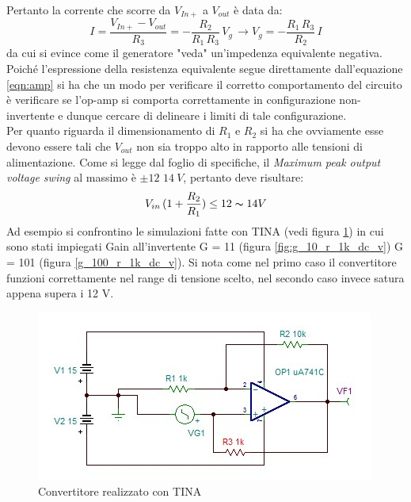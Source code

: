 \documentclass[journal, a4paper]{IEEEtran}
\begin{document}
Pertanto la corrente che scorre da $V_{In+}$ a $V_{out}$ è data da:
\begin{equation}
I = \frac{V_{In+} - V_{out}}{R_3} = -\frac{R_2}{R_1 \, R_3}\, V_g \, \rightarrow V_g = -\frac{R_1\,R_3}{R_2}\,I
\end{equation}
da cui si evince come il generatore "veda" un'impedenza equivalente negativa.\\
Poiché l'espressione della resistenza equivalente segue direttamente dall'equazione \ref{eqn:amp} si ha che un modo per verificare il corretto comportamento del circuito è verificare se l'op-amp si comporta correttamente in configurazione non-invertente e dunque cercare di delineare i limiti di tale configurazione.\\
Per quanto riguarda il dimensionamento di $R_1$ e $R_2$ si ha che ovviamente esse devono essere tali che $V_{out}$ non sia troppo alto in rapporto alle tensioni di alimentazione. Come si legge dal foglio di specifiche, il \textit{Maximum peak output voltage swing} al massimo è $\pm 12$ \textdiv $14~V$, pertanto deve risultare:
\begin{equation}
V_{in}\,(1+\frac{R_2}{R_1}) \leq 12 \thicksim 14 V
\end{equation}
Ad esempio si confrontino le simulazioni fatte con TINA (vedi figura \ref{fig:negimpcon}) in cui sono stati impiegati Gain all'invertente G = 11 (figura \ref{fig:g_10_r_1k_dc_v})  G = 101 (figura \ref{g_100_r_1k_dc_v}). Si nota come nel primo caso il convertitore funzioni correttamente nel range di tensione scelto, nel secondo caso invece satura appena supera i 12 V.\\

\begin{figure}
\centering
\includegraphics[scale=.6]{negatimpeconv}
\caption{Convertitore realizzato con TINA}
\label{fig:negimpcon}
\end{figure}
\end{document}

